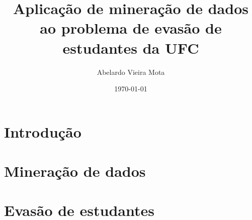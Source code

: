 \documentclass[a4paper]{article}
\title{Aplicação de mineração de dados ao problema de evasão de estudantes da UFC}
\author{Abelardo Vieira Mota}
\date{\today}
\begin{document}
\maketitle

\begin{abstract}

\end{abstract}

\listoffigures
\tableofcontents


\section{Introdução}


\section{Mineração de dados}


\section{Evasão de estudantes}



\end{document}
